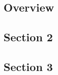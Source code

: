 \subsection{Overview}
\blindtext

\subsection{Section 2}
\blindtext

\subsection{Section 3}
\blindtext
